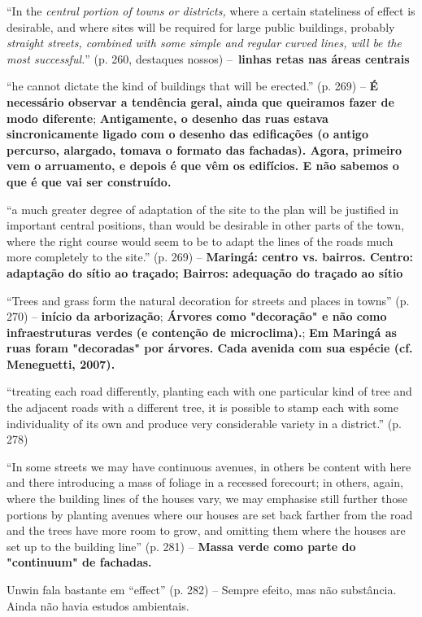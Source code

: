 \documentclass[12pt, a4paper]{book} %
\begin{document}
        ``In the \textit{central portion of towns or districts,} where a certain stateliness of effect is desirable, and where sites will be required for large public buildings, probably \textit{straight streets, combined with some simple and regular curved lines, will be the most successful.}'' (p. 260, destaques nossos) – \textbf{linhas retas nas áreas centrais}

        ``he cannot dictate the kind of buildings that will be erected.'' (p. 269) – \textbf{É necessário observar a tendência geral, ainda que queiramos fazer de modo diferente}; \textbf{Antigamente, o desenho das ruas estava sincronicamente ligado com o desenho das edificações (o antigo percurso, alargado, tomava o formato das fachadas). Agora, primeiro vem o arruamento, e depois é que vêm os edifícios. E não sabemos o que é que vai ser construído.}

        ``a much greater degree of adaptation of the site to the plan will be justified in important central positions, than would be desirable in other parts of the town, where the right course would seem to be to adapt the lines of the roads much more completely to the site.'' (p. 269) – \textbf{Maringá: centro vs. bairros. Centro: adaptação do sítio ao traçado; Bairros: adequação do traçado ao sítio}

        ``Trees and grass form the natural decoration for streets and places in towns'' (p. 270) – \textbf{início da arborização}; \textbf{Árvores como "decoração" e não como infraestruturas verdes (e contenção de microclima).}; \textbf{Em Maringá as ruas foram "decoradas" por árvores. Cada avenida com sua espécie (cf. Meneguetti, 2007).}

        ``treating each road differently, planting each with one particular kind of tree and the adjacent roads with a different tree, it is possible to stamp each with some individuality of its own and produce very considerable variety in a district.'' (p. 278)

        ``In some streets we may have continuous avenues, in others be content with here and there introducing a mass of foliage in a recessed forecourt; in others, again, where the building lines of the houses vary, we may emphasise still further those portions by planting avenues where our houses are set back farther from the road and the trees have more room to grow, and omitting them where the houses are set up to the building line'' (p. 281) – \textbf{Massa verde como parte do "continuum" de fachadas.}

        Unwin fala bastante em ``effect'' (p. 282) – Sempre efeito, mas não substância. Ainda não havia estudos ambientais.
\end{document}

